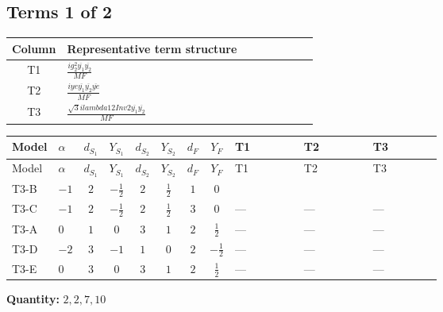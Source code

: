 \documentclass[8pt]{article}
\begin{document}
\begin{landscape}
\subsection*{Terms 1 of 2}
\begin{center}
\begin{tabular}{@{}c >{\raggedright\arraybackslash}p{0.82\linewidth}@{}}
\toprule
Column & Representative term structure \\
\midrule
T1 & \(\displaystyle \frac{i g_{2}^{2} \overline{y_{1}} \overline{y_{2}}}{MF}\) \\
\midrule
T2 & \(\displaystyle \frac{i ye \overline{y_{1}} \overline{y_{2}} \overline{ye}}{MF}\) \\
\midrule
T3 & \(\displaystyle \frac{\sqrt{3} i lambda12Inv2 \overline{y_{1}} \overline{y_{2}}}{MF}\) \\
\midrule
\bottomrule
\end{tabular}
\end{center}
\smallskip
\tiny
\begin{longtable}{@{}llcccccc >{\raggedright\arraybackslash}p{0.21\linewidth} >{\raggedright\arraybackslash}p{0.21\linewidth} >{\raggedright\arraybackslash}p{0.21\linewidth}@{}}
\toprule
Model & $\alpha$ & $d_{S_1}$ & $Y_{S_1}$ & $d_{S_2}$ & $Y_{S_2}$ & $d_F$ & $Y_F$ & T1 & T2 & T3 \\
\midrule
\endfirsthead
\toprule
Model & $\alpha$ & $d_{S_1}$ & $Y_{S_1}$ & $d_{S_2}$ & $Y_{S_2}$ & $d_F$ & $Y_F$ & T1 & T2 & T3 \\
\midrule
\endhead
T3-B & $-1$ & $2$ & $-\frac{1}{2}$ & $2$ & $\frac{1}{2}$ & $1$ & $0$ & \scriptsize\adjustbox{max width=\linewidth}{$\begin{gathered} \frac{3 i g_{2}^{2} \overline{y_{1}} \overline{y_{2}}}{4 MF}\end{gathered}$} & \scriptsize\adjustbox{max width=\linewidth}{$\begin{gathered} - \frac{i ye \overline{y_{1}} \overline{y_{2}} \overline{ye}}{4 MF}\end{gathered}$} & \scriptsize\adjustbox{max width=\linewidth}{$\begin{gathered} \frac{\sqrt{3} i lambda12Inv2 \overline{y_{1}} \overline{y_{2}}}{3 MF}\end{gathered}$} \\
\midrule
T3-C & $-1$ & $2$ & $-\frac{1}{2}$ & $2$ & $\frac{1}{2}$ & $3$ & $0$ & --- & --- & --- \\
\midrule
T3-A & $0$ & $1$ & $0$ & $3$ & $1$ & $2$ & $\frac{1}{2}$ & --- & --- & --- \\
\midrule
T3-D & $-2$ & $3$ & $-1$ & $1$ & $0$ & $2$ & $-\frac{1}{2}$ & --- & --- & --- \\
\midrule
T3-E & $0$ & $3$ & $0$ & $3$ & $1$ & $2$ & $\frac{1}{2}$ & --- & --- & --- \\
\midrule
\bottomrule
\end{longtable}
\clearpage
\noindent\textbf{Quantity: }$\mathrm{2,2,7,10}$\par\smallskip

\end{landscape}
\end{document}
